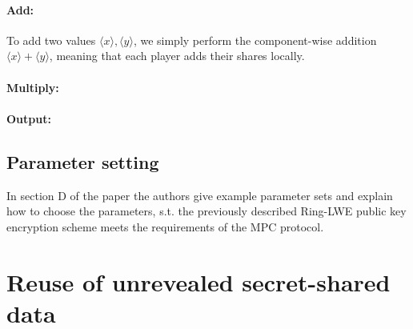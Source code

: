\documentclass{article}
\begin{document}
\paragraph{Add:} To add two values $\langle x \rangle, \langle y \rangle$, we simply perform the component-wise addition $\langle x \rangle + \langle y \rangle$, meaning that each player adds their shares locally. %

\paragraph{Multiply:}

\paragraph{Output:}

\subsection{Parameter setting}
In section D of the paper the authors give example parameter sets and explain how to choose the parameters, s.t. the previously described Ring-LWE public key encryption scheme meets the requirements of the MPC protocol.

\section{Reuse of unrevealed secret-shared data}
\end{document}
